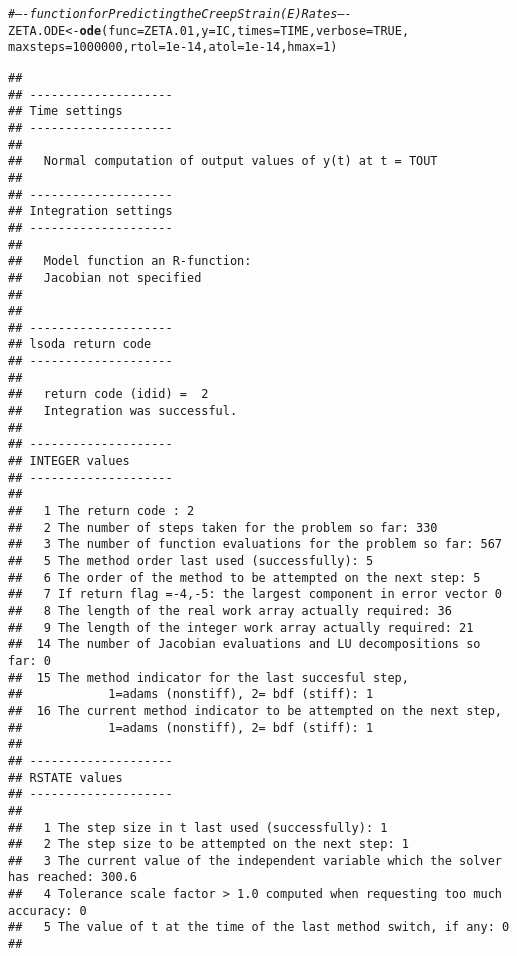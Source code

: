 \documentclass{article}\usepackage[]{graphicx}\usepackage[]{color}
\makeatletter
\newcommand{\hlnum}[1]{\textcolor[rgb]{0.686,0.059,0.569}{#1}}%
\newcommand{\hlcom}[1]{\textcolor[rgb]{0.678,0.584,0.686}{\textit{#1}}}%
\newcommand{\hlstd}[1]{\textcolor[rgb]{0.345,0.345,0.345}{#1}}%
\newcommand{\hlkwb}[1]{\textcolor[rgb]{0.69,0.353,0.396}{#1}}%
\newcommand{\hlkwc}[1]{\textcolor[rgb]{0.333,0.667,0.333}{#1}}%
\newcommand{\hlkwd}[1]{\textcolor[rgb]{0.737,0.353,0.396}{\textbf{#1}}}%
\newenvironment{kframe}{%
 \def\at@end@of@kframe{}%
 \ifinner\ifhmode%
  \def\at@end@of@kframe{\end{minipage}}%
  \begin{minipage}{\columnwidth}%
 \fi\fi%
 \def\FrameCommand##1{\hskip\@totalleftmargin \hskip-\fboxsep
 \colorbox{shadecolor}{##1}\hskip-\fboxsep
     \hskip-\linewidth \hskip-\@totalleftmargin \hskip\columnwidth}%
 \MakeFramed {\advance\hsize-\width
   \@totalleftmargin\z@ \linewidth\hsize
   \@setminipage}}%
 {\par\unskip\endMakeFramed%
 \at@end@of@kframe}
\newenvironment{knitrout}{}{} %
\makeatother
\begin{document}
\begin{knitrout}
\begin{kframe}
\begin{alltt}
\hlcom{# ---- function for Predicting the Creep Strain(E) Rates ----}
 \hlstd{ZETA.ODE} \hlkwb{<-} \hlkwd{ode}\hlstd{(}\hlkwc{func} \hlstd{=ZETA.01,} \hlkwc{y} \hlstd{= IC,} \hlkwc{times} \hlstd{= TIME,} \hlkwc{verbose} \hlstd{=} \hlnum{TRUE}\hlstd{,}
                 \hlkwc{maxsteps} \hlstd{=} \hlnum{1000000}\hlstd{,} \hlkwc{rtol} \hlstd{=} \hlnum{1e-14}\hlstd{,} \hlkwc{atol} \hlstd{=} \hlnum{1e-14}\hlstd{,} \hlkwc{hmax} \hlstd{=} \hlnum{1} \hlstd{)}
\end{alltt}
\begin{verbatim}
## 
## -------------------- 
## Time settings 
## --------------------
##  
##   Normal computation of output values of y(t) at t = TOUT 
## 
## -------------------- 
## Integration settings 
## --------------------
##  
##   Model function an R-function:  
##   Jacobian not specified 
## 
## 
## --------------------
## lsoda return code
## --------------------
## 
##   return code (idid) =  2 
##   Integration was successful.
## 
## --------------------
## INTEGER values
## --------------------
## 
##   1 The return code : 2 
##   2 The number of steps taken for the problem so far: 330 
##   3 The number of function evaluations for the problem so far: 567 
##   5 The method order last used (successfully): 5 
##   6 The order of the method to be attempted on the next step: 5 
##   7 If return flag =-4,-5: the largest component in error vector 0 
##   8 The length of the real work array actually required: 36 
##   9 The length of the integer work array actually required: 21 
##  14 The number of Jacobian evaluations and LU decompositions so far: 0 
##  15 The method indicator for the last succesful step,
##            1=adams (nonstiff), 2= bdf (stiff): 1 
##  16 The current method indicator to be attempted on the next step,
##            1=adams (nonstiff), 2= bdf (stiff): 1 
##  
## --------------------
## RSTATE values
## --------------------
## 
##   1 The step size in t last used (successfully): 1 
##   2 The step size to be attempted on the next step: 1 
##   3 The current value of the independent variable which the solver has reached: 300.6 
##   4 Tolerance scale factor > 1.0 computed when requesting too much accuracy: 0 
##   5 The value of t at the time of the last method switch, if any: 0 
## 
\end{verbatim}
\end{kframe}
\end{knitrout}
\end{document}
